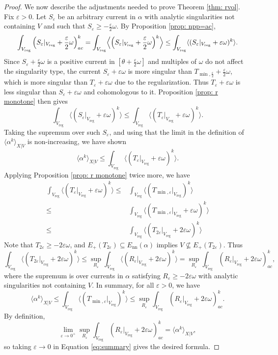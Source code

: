 \documentclass[a4paper]{amsart}
\renewcommand{\epsilon}{\varepsilon}
\newcommand{\nn}{\text{nn}}
\newcommand{\reg}{{\operatorname{reg}}}
\theoremstyle{definition}
\begin{document}
\begin{proof}
    We now describe the adjustments needed to prove Theorem \ref{thm: rvol}. Fix $\epsilon > 0$. Let $S_\epsilon$ be an arbitrary current in $\alpha$ with analytic singularities not containing $V$ and such that $S_\epsilon \ge -\frac{\epsilon}{2}\omega$. By Proposition \ref{prop: npp=ac},
    \[
        \int_{V_\reg}\left(S_\epsilon|_{V_\reg} + \frac{\epsilon}{2}\omega\right)_{ac}^k = \int_{V_\reg}\Bigl\langle \left(S_\epsilon|_{V_\reg} + \frac{\epsilon}{2}\omega\right)^k\Bigr\rangle \le \int_{V_\reg}\langle (S_\epsilon|_{V_\reg} + \epsilon\omega)^k\rangle.
    \] 
    Since $S_\epsilon + \frac{\epsilon}{2}\omega$ is a positive current in $[\theta + \frac{\epsilon}{2}\omega]$ and multiples of $\omega$ do not affect the singularity type, the current $S_\epsilon + \epsilon\omega$ is more singular than $T_{\min, \frac{\epsilon}{2}} + \frac{\epsilon}{2}\omega$, which is more singular than $T_\epsilon + \epsilon\omega$ due to the regularization. Thus $T_\epsilon + \epsilon\omega$ is less singular than $S_\epsilon + \epsilon\omega$ and cohomologous to it. Proposition \ref{prop: r monotone} then gives 
    \[\int_{V_\reg}\langle (S_\epsilon|_{V_\reg} + \epsilon\omega)^k\rangle \le \int_{V_\reg}\langle (T_\epsilon|_{V_\reg} + \epsilon\omega)^k\rangle.\] Taking the supremum over such $S_\epsilon$, and using that the limit in the definition of $\langle\alpha^k\rangle_{X|V}$ is non-increasing, we have shown 
    \[\langle\alpha^k\rangle_{X|V} \le \int_{V_\reg}\langle (T_\epsilon|_{V_\reg} + \epsilon\omega)^k\rangle.\]
    Applying Proposition \ref{prop: r monotone} twice more, we have
\begin{align*}
    \int_{V_\reg}\langle (T_\epsilon|_{V_\reg} + \epsilon\omega)^k\rangle \le& \int_{V_\reg}\langle (T_{\min, \epsilon}|_{V_\reg})^k\rangle\\
    \le& \int_{V_\reg}\langle (T_{\min, \epsilon}|_{V_\reg} +\epsilon\omega)^k\rangle\\
    \le& \int_{V_\reg}\langle (T_{2\epsilon}|_{V_\reg} + 2\epsilon\omega)^k\rangle
\end{align*}
Note that $T_{2\epsilon} \ge -2\epsilon\omega$, and $E_+(T_{2\epsilon}) \subseteq E_{\nn}(\alpha)$ implies $V \nsubseteq E_+(T_{2\epsilon})$. Thus 
\[\int_{V_\reg}\langle (T_{2\epsilon}|_{V_\reg} + 2\epsilon\omega)^k\rangle \le \sup_{R_\epsilon}\int_{V_\reg}\langle (R_{\epsilon}|_{V_\reg} + 2\epsilon\omega)^k\rangle = \sup_{R_\epsilon}\int_{V_\reg} (R_{\epsilon}|_{V_\reg} + 2\epsilon\omega)^k_{ac},\]
where the supremum is over currents in $\alpha$ satisfying $R_\epsilon \ge -2\epsilon\omega$ with analytic singularities not containing $V$. In summary, for all $\epsilon >0$, we have
\begin{equation}\label{eq:summary}
    \langle \alpha^k\rangle_{X|V} \le \int_{V_\reg}\langle (T_{\min, \epsilon}|_{V_\reg})^k\rangle \le \sup_{R_\epsilon}\int_{V_\reg} (R_{\epsilon}|_{V_\reg} + 2\epsilon\omega)^k_{ac}.
\end{equation}
By definition,
\[\lim_{\epsilon \to 0^+}\sup_{R_\epsilon}\int_{V_\reg} (R_{\epsilon}|_{V_\reg} + 2\epsilon\omega)^k_{ac} = \langle \alpha^k\rangle_{X|V},\]
so taking $\epsilon \to 0$ in Equation \eqref{eq:summary} gives the desired formula.
\end{proof}
\end{document}
